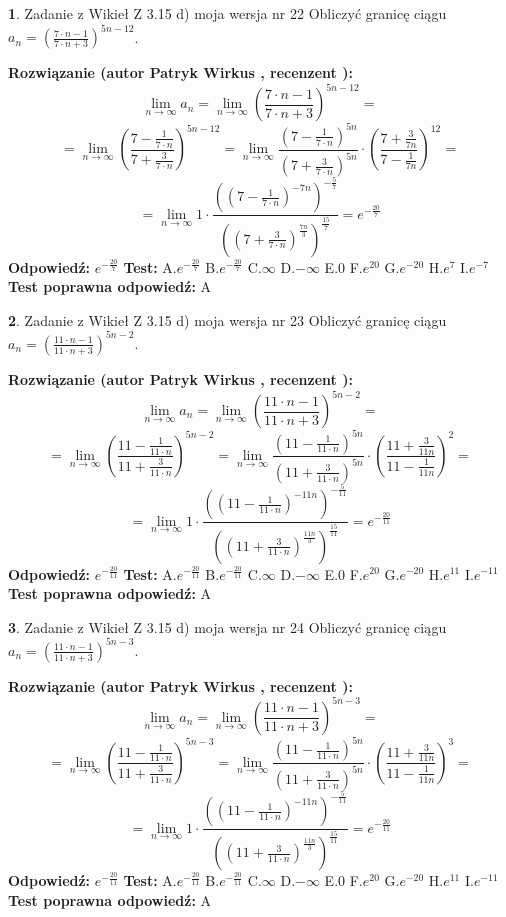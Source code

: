\documentclass[12pt, a4paper]{article}
\theoremstyle{definition} %
\newtheorem{zad}{}
\newcommand{\zadStart}[1]{\begin{zad}#1\newline}
\newcommand{\zadStop}{\end{zad}}
\newcommand{\rozwStart}[2]{\noindent \textbf{Rozwiązanie (autor #1 , recenzent #2): }\newline}
\newcommand{\rozwStop}{\newline}
\newcommand{\odpStart}{\noindent \textbf{Odpowiedź:}\newline}
\newcommand{\odpStop}{\newline}
\newcommand{\testStart}{\noindent \textbf{Test:}\newline}
\newcommand{\testStop}{\newline}
\newcommand{\kluczStart}{\noindent \textbf{Test poprawna odpowiedź:}\newline}
\newcommand{\kluczStop}{\newline}
\begin{document}
\zadStart{Zadanie z Wikieł Z 3.15 d) moja wersja nr 22}
Obliczyć granicę ciągu $a_{n}=(\frac{7\cdot n - 1}{7 \cdot n + 3})^{5n-12}$.
\zadStop
\rozwStart{Patryk Wirkus}{}
$$\lim\limits_{n\to\infty} a_{n} = \lim\limits_{n\to\infty}(\frac{7\cdot n - 1}{7 \cdot n + 3})^{5n-12}=$$
$$=\lim\limits_{n\to\infty}(\frac{7 - \frac{1}{7\cdot n}}{7 + \frac{3}{7 \cdot n}})^{5n-12}=\lim\limits_{n\to\infty}\frac{(7 - \frac{1}{7\cdot n})^{5n}}{(7 + \frac{3}{7\cdot n})^{5n}} \cdot (\frac{7+\frac{3}{7n}}{7-\frac{1}{7n}})^{12}=$$
$$=\lim\limits_{n\to\infty} 1 \cdot \frac{((7-\frac{1}{7 \cdot n})^{-7n})^{-\frac{5}{7}}}{((7+\frac{3}{7 \cdot n})^{\frac{7n}{3}})^{\frac{15}{7}}} =e^{-\frac{20}{7}}$$
\rozwStop
\odpStart
$e^{-\frac{20}{7}}$
\odpStop
\testStart
A.$ e^{-\frac{20}{7}}$
B.$ e^{-\frac{20}{7}}$
C.$\infty$
D.$-\infty$
E.$0$
F.$e^{20}$
G.$e^{-20}$
H.$e^{7}$
I.$e^{-7}$
\testStop
\kluczStart
A
\kluczStop



\zadStart{Zadanie z Wikieł Z 3.15 d) moja wersja nr 23}
Obliczyć granicę ciągu $a_{n}=(\frac{11\cdot n - 1}{11 \cdot n + 3})^{5n-2}$.
\zadStop
\rozwStart{Patryk Wirkus}{}
$$\lim\limits_{n\to\infty} a_{n} = \lim\limits_{n\to\infty}(\frac{11\cdot n - 1}{11 \cdot n + 3})^{5n-2}=$$
$$=\lim\limits_{n\to\infty}(\frac{11 - \frac{1}{11\cdot n}}{11 + \frac{3}{11 \cdot n}})^{5n-2}=\lim\limits_{n\to\infty}\frac{(11 - \frac{1}{11\cdot n})^{5n}}{(11 + \frac{3}{11\cdot n})^{5n}} \cdot (\frac{11+\frac{3}{11n}}{11-\frac{1}{11n}})^{2}=$$
$$=\lim\limits_{n\to\infty} 1 \cdot \frac{((11-\frac{1}{11 \cdot n})^{-11n})^{-\frac{5}{11}}}{((11+\frac{3}{11 \cdot n})^{\frac{11n}{3}})^{\frac{15}{11}}} =e^{-\frac{20}{11}}$$
\rozwStop
\odpStart
$e^{-\frac{20}{11}}$
\odpStop
\testStart
A.$ e^{-\frac{20}{11}}$
B.$ e^{-\frac{20}{11}}$
C.$\infty$
D.$-\infty$
E.$0$
F.$e^{20}$
G.$e^{-20}$
H.$e^{11}$
I.$e^{-11}$
\testStop
\kluczStart
A
\kluczStop



\zadStart{Zadanie z Wikieł Z 3.15 d) moja wersja nr 24}
Obliczyć granicę ciągu $a_{n}=(\frac{11\cdot n - 1}{11 \cdot n + 3})^{5n-3}$.
\zadStop
\rozwStart{Patryk Wirkus}{}
$$\lim\limits_{n\to\infty} a_{n} = \lim\limits_{n\to\infty}(\frac{11\cdot n - 1}{11 \cdot n + 3})^{5n-3}=$$
$$=\lim\limits_{n\to\infty}(\frac{11 - \frac{1}{11\cdot n}}{11 + \frac{3}{11 \cdot n}})^{5n-3}=\lim\limits_{n\to\infty}\frac{(11 - \frac{1}{11\cdot n})^{5n}}{(11 + \frac{3}{11\cdot n})^{5n}} \cdot (\frac{11+\frac{3}{11n}}{11-\frac{1}{11n}})^{3}=$$
$$=\lim\limits_{n\to\infty} 1 \cdot \frac{((11-\frac{1}{11 \cdot n})^{-11n})^{-\frac{5}{11}}}{((11+\frac{3}{11 \cdot n})^{\frac{11n}{3}})^{\frac{15}{11}}} =e^{-\frac{20}{11}}$$
\rozwStop
\odpStart
$e^{-\frac{20}{11}}$
\odpStop
\testStart
A.$ e^{-\frac{20}{11}}$
B.$ e^{-\frac{20}{11}}$
C.$\infty$
D.$-\infty$
E.$0$
F.$e^{20}$
G.$e^{-20}$
H.$e^{11}$
I.$e^{-11}$
\testStop
\kluczStart
A
\kluczStop
\end{document}
